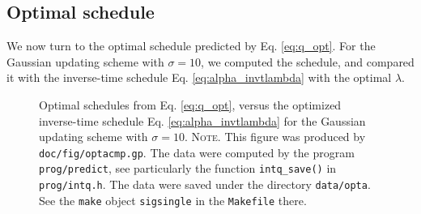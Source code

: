 \documentclass[reprint, floatfix]{revtex4-1}
\newcommand{\note}[1]{{\color{DarkGreen}\footnotesize \textsc{Note.} #1}}
\begin{document}
%
%
%
%
%


\subsection{Optimal schedule}


We now turn to the optimal schedule
predicted by Eq. \eqref{eq:q_opt}.
%
For the Gaussian updating scheme
with $\sigma = 10$,
we computed the schedule,
and compared it with the inverse-time schedule
Eq. \eqref{eq:alpha_invtlambda}
with the optimal $\lambda$.

\begin{figure}[h]
\begin{center}
  \caption{
    \label{fig:optacmp}
    Optimal schedules from Eq. \eqref{eq:q_opt},
    versus the optimized inverse-time schedule
    Eq. \eqref{eq:alpha_invtlambda}
    for the Gaussian updating scheme
    with $\sigma = 10$.
    \note{This figure was produced by \texttt{doc/fig/optacmp.gp}.
      The data were computed by the program \texttt{prog/predict},
      see particularly the function \texttt{intq\_save()}
      in \texttt{prog/intq.h}.
      The data were saved under the directory \texttt{data/opta}.
      See the \texttt{make} object \texttt{sigsingle}
      in the \texttt{Makefile} there.
    }
  }
\end{center}
\end{figure}
\end{document}
